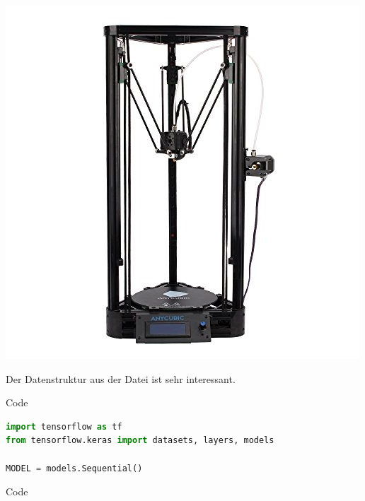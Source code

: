 {
	\begin{center}
		\includegraphics[height=0.8\textheight]{images/Rostock}
	\end{center}	
}


{
  Der Datenstruktur  aus der Datei  ist sehr interessant.	
}


\begin{frame}[fragile]{Code}


  \begin{lstlisting}[language=Python]
import tensorflow as tf
from tensorflow.keras import datasets, layers, models

MODEL = models.Sequential()
  \end{lstlisting}

\end{frame}

\begin{frame}[fragile]{Code}

  
\end{frame}
